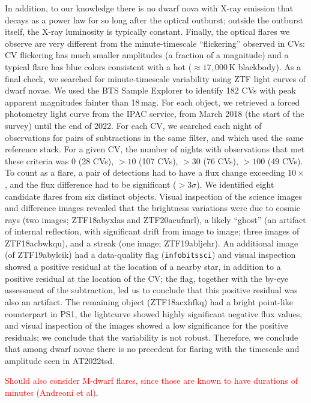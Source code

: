 \documentclass{nature_plusfigure}
\newcommand{\at}{AT2022tsd}
\begin{document}
\begin{methods}
In addition, to our knowledge there is no dwarf nova with X-ray emission that decays as a power law for so long after the optical outburst; outside the outburst itself, the X-ray luminosity is typically constant\cite{Fertig2011}.
Finally, the optical flares we observe are very different from the minute-timescale ``flickering'' observed in CVs: CV flickering has much smaller amplitudes (a fraction of a magnitude\cite{Bruch2021}) and a typical flare has blue colors consistent with a hot ($\approx17,000\,$K blackbody\cite{Bruch2021}).
As a final check, we searched for minute-timescale variability using ZTF light curves of dwarf novae. 
We used the BTS Sample Explorer to identify 182 CVs with peak apparent magnitudes fainter than 18\,mag.
For each object, we retrieved a forced photometry light curve from the IPAC service, from March 2018 (the start of the survey) until the end of 2022. For each CV, we searched each night of observations for pairs of subtractions in the same filter, and which used the same reference stack. For a given CV, the number of nights with observations that met these criteria was 0 (28 CVs), $>10$ (107 CVs), $>30$ (76 CVs), $>100$ (49 CVs). 
To count as a flare, a pair of detections had to have a flux change exceeding $10\times$, and the flux difference had to be significant ($>3\sigma$).
We identified eight candidate flares from six distinct objects. Visual inspection of the science images and difference images revealed that the brightness variations were due to cosmic rays (two images; ZTF18abyxlas and ZTF20acufmrl), a likely ``ghost'' (an artifact of internal reflection, with significant drift from image to image; three images of ZTF18acbwkqu), and a streak (one image; ZTF19abljehr). An additional image (of ZTF19abylcik) had a data-quality flag (\texttt{infobitssci}) and visual inspection showed a positive residual at the location of a nearby star, in addition to a positive residual at the location of the CV; the flag, together with the by-eye assessment of the subtraction, led us to conclude that this positive residual was also an artifact. The remaining object (ZTF18acxhfkq) had a bright point-like counterpart in PS1, the lightcurve showed highly significant negative flux values, and visual inspection of the images showed a low significance for the positive residuals; we conclude that the variability is not robust.  
Therefore, we conclude that among dwarf novae there is no precedent for flaring with the timescale and amplitude seen in \at.

\textcolor{red}{Should also consider M-dwarf flares, since those are known to have durations of minutes (Andreoni et al)}.


\end{methods}
\end{document}
